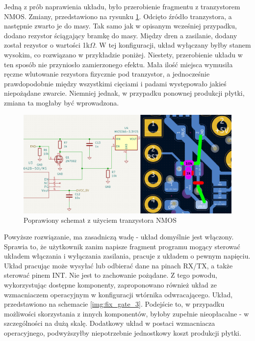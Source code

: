 Jedną z prób naprawienia układu, było przerobienie fragmentu z tranzystorem NMOS. Zmiany, przedstawiono na rysunku \ref{img:fix_gate_2}. Odcięto źródło tranzystora, a następnie zwarto je do masy. Tak samo jak w opisanym wcześniej przypadku, dodano rezystor ściągający bramkę do masy. Między dren a zasilanie, dodany został rezystor o wartości 1k$\Omega$. W tej konfiguracji, układ wyłączany byłby stanem wysokim, co rozwiązano w przykładzie poniżej. Niestety, przerobienie układu w ten sposób nie przyniosło zamierzonego efektu. Mała ilość miejsca wymusiła ręczne wlutowanie rezystora fizycznie pod tranzystor, a jednocześnie prawdopodobnie między wszystkimi cięciami i padami występowało jakieś niepożądane zwarcie. Niemniej jednak, w przypadku ponownej produkcji płytki, zmiana ta mogłaby być wprowadzona.
\begin{figure}[H]
    \centering
    \includegraphics[width=\textwidth, height=\textheight, keepaspectratio]{Graphics/fix_gate_2.png}
    \caption{Poprawiony schemat z użyciem tranzystora NMOS}
    \label{img:fix_gate_2}
\end{figure}
Powyższe rozwiązanie, ma zasadniczą wadę - układ domyślnie jest włączony. Sprawia to, że użytkownik zanim napisze fragment programu mogący sterować układem włączania i wyłączania zasilania, pracuje z układem o pewnym napięciu. Układ pracując może wysyłać lub odbierać dane na pinach RX/TX, a także sterować pinem INT. Nie jest to zachowanie pożądane. Z tego powodu, wykorzystując dostępne komponenty, zaproponowano również układ ze wzmacniaczem operacyjnym w konfiguracji wtórnika odwracającego. Układ, przedstawiono na schemacie \ref{img:fix_gate_3}. Podejście to, w przypadku możliwości skorzystania z innych komponentów, byłoby zupełnie nieopłacalne - w szczególności na dużą skalę. Dodatkowy układ w postaci wzmacniacza operacyjnego, podwyższyłby niepotrzebnie jednostkowy koszt produkcji płytki.

